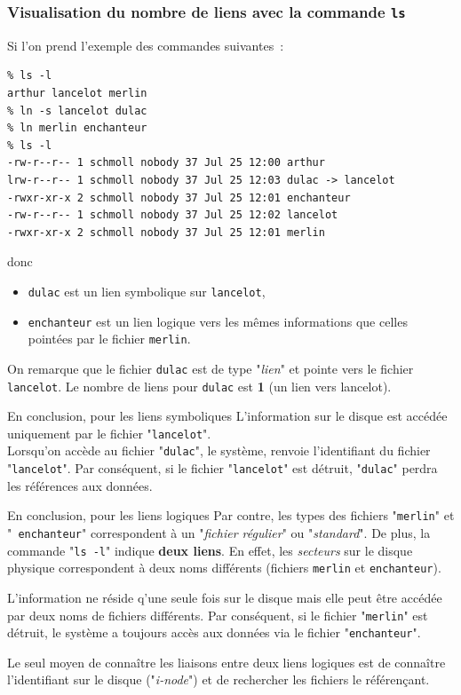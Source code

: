 \subsubsection{Visualisation du nombre de liens avec la commande {\tt ls}}

\begin{example}
Si l'on prend l'exemple des commandes suivantes~:
\begin{verbatim}
% ls -l
arthur lancelot merlin
% ln -s lancelot dulac
% ln merlin enchanteur
% ls -l
-rw-r--r-- 1 schmoll nobody 37 Jul 25 12:00 arthur
lrw-r--r-- 1 schmoll nobody 37 Jul 25 12:03 dulac -> lancelot
-rwxr-xr-x 2 schmoll nobody 37 Jul 25 12:01 enchanteur
-rw-r--r-- 1 schmoll nobody 37 Jul 25 12:02 lancelot
-rwxr-xr-x 2 schmoll nobody 37 Jul 25 12:01 merlin
\end{verbatim}
donc
\begin{itemize}
	\item {\tt dulac} est un lien symbolique sur {\tt lancelot},
	\item {\tt enchanteur} est un lien logique vers les m{\^e}mes informations
			que celles point{\'e}es par le fichier {\tt merlin}.
\end{itemize}

On remarque que le fichier {\tt dulac} est de
type "{\sl lien}" et pointe vers le fichier {\tt lancelot}. Le
nombre de liens pour {\tt dulac} est {\bf 1} (un lien vers lancelot).
\end{example}

\begin{definition}{En conclusion, pour les liens symboliques}
L'information sur le disque est acc{\'e}d{\'e}e uniquement par le fichier
"{\tt lancelot}". \\
Lorsqu'on acc{\`e}de au fichier "{\tt dulac}", le syst{\`e}me,
renvoie l'identifiant du fichier  "{\tt lancelot}". Par
cons{\'e}quent, si le fichier "{\tt lancelot}" est d{\'e}truit,
"{\tt dulac}" perdra les r{\'e}f{\'e}rences aux donn{\'e}es.
\end{definition}

\begin{definition}{En conclusion, pour les liens logiques}
Par contre, les types des fichiers "{\tt merlin}" et "{\tt
enchanteur}" correspondent {\`a} un "{\sl fichier r{\'e}gulier}"
ou "{\sl standard}". De plus, la commande "{\tt ls -l}" indique
{\bf deux liens}. En effet, les {\it secteurs} sur le disque physique
correspondent {\`a} deux noms diff{\'e}rents (fichiers {\tt merlin} et
{\tt enchanteur}).

L'information ne r{\'e}side q'une seule fois sur le disque mais elle
peut {\^e}tre acc{\'e}d{\'e}e par deux noms de fichiers diff{\'e}rents.
Par cons{\'e}quent, si le fichier "{\tt merlin}" est d{\'e}truit,
le syst{\`e}me a toujours acc{\`e}s aux donn{\'e}es via le fichier
"{\tt enchanteur}".

Le seul moyen de conna{\^i}tre les liaisons entre deux liens logiques est de
conna{\^i}tre l'identifiant sur le disque ("\textsl{i-node}") et de
rechercher les fichiers le r{\'e}f{\'e}ren\c{c}ant.
\end{definition}

